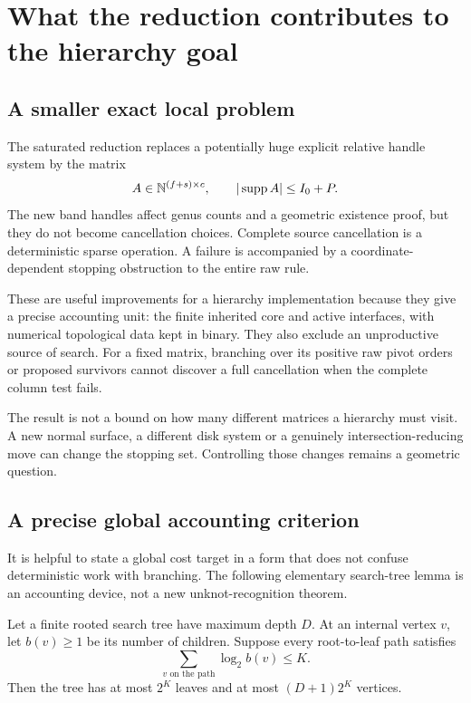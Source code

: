 \section{What the reduction contributes to the hierarchy goal}
\label{sec:hierarchy}

\subsection{A smaller exact local problem}

The saturated reduction replaces a potentially huge explicit relative
handle system by the matrix
\[
 A\in\mathbb N^{(f+s)\times c},\qquad
 |\operatorname{supp} A|\le I_0+P.
\]
The new band handles affect genus counts and a geometric existence proof,
but they do not become cancellation choices. Complete source cancellation
is a deterministic sparse operation. A failure is accompanied by a
coordinate-dependent stopping obstruction to the entire raw rule.

These are useful improvements for a hierarchy implementation because they
give a precise accounting unit: the finite inherited core and active
interfaces, with numerical topological data kept in binary. They also
exclude an unproductive source of search. For a fixed matrix, branching
over its positive raw pivot orders or proposed survivors cannot discover
a full cancellation when the complete column test fails.

The result is not a bound on how many different matrices a hierarchy must
visit. A new normal surface, a different disk system or a genuinely
intersection-reducing move can change the stopping set. Controlling those
changes remains a geometric question.

\subsection{A precise global accounting criterion}

It is helpful to state a global cost target in a form that does not confuse
deterministic work with branching. The following elementary search-tree
lemma is an accounting device, not a new unknot-recognition theorem.

\begin{lemma}\label{lem:branch-product}
Let a finite rooted search tree have maximum depth $D$. At an internal
vertex $v$, let $b(v)\ge1$ be its number of children. Suppose every
root-to-leaf path satisfies
\[
 \sum_{v\text{ on the path}}\log_2 b(v)\le K.
\]
Then the tree has at most $2^K$ leaves and at most $(D+1)2^K$ vertices.
\end{lemma}

